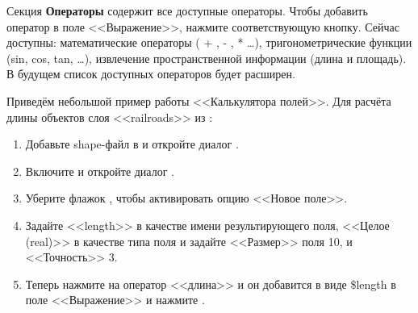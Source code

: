 Секция \textbf{Операторы} содержит все доступные операторы. Чтобы добавить
оператор в поле <<Выражение>>, нажмите соответствующую кнопку. Сейчас
доступны: математические операторы ( + , - , * \dots), тригонометрические
функции (sin, cos, tan, \dots), извлечение пространственной информации
(длина и площадь). В будущем список доступных операторов будет расширен.

Приведём небольшой пример работы <<Калькулятора полей>>. Для расчёта
длины объектов слоя <<railroads>> из :

\begin{enumerate}
\item Добавьте shape-файл  в \qg и откройте
диалог .
\item Включите  и
откройте диалог .
\item Уберите флажок , чтобы активировать
опцию <<Новое поле>>.
\item Задайте <<length>> в качестве имени результирующего поля, <<Целое (real)>>
в качестве типа поля и задайте <<Размер>> поля 10, и <<Точность>> 3.
\item Теперь нажмите на оператор <<длина>> и он добавится в виде \$length в
поле <<Выражение>> и нажмите .
\end{enumerate}

